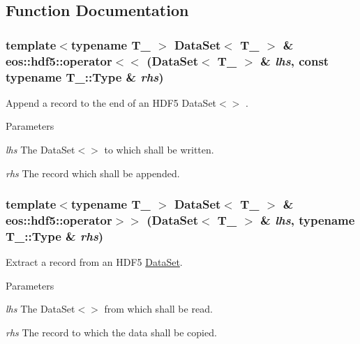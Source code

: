 \subsection{Function Documentation}
\hypertarget{namespaceeos_1_1hdf5_a8da5ea7dae12acf02081ea4fc320dc3a}{
\subsubsection[{operator$<$$<$}]{\setlength{\rightskip}{0pt plus 5cm}template$<$typename T\_\- $>$ {\bf DataSet}$<$ T\_\- $>$ \& eos::hdf5::operator$<$$<$ (DataSet$<$ T\_\- $>$ \& {\em lhs}, \/  const typename T\_\-::Type \& {\em rhs})}}
\label{namespaceeos_1_1hdf5_a8da5ea7dae12acf02081ea4fc320dc3a}
Append a record to the end of an HDF5 DataSet$<$$>$ .


\begin{DoxyParams}{Parameters}
\item[{\em lhs}]The DataSet$<$$>$ to which shall be written. \item[{\em rhs}]The record which shall be appended. \end{DoxyParams}
\hypertarget{namespaceeos_1_1hdf5_a59f5217285970b223b8a4932b811106e}{
\subsubsection[{operator$>$$>$}]{\setlength{\rightskip}{0pt plus 5cm}template$<$typename T\_\- $>$ {\bf DataSet}$<$ T\_\- $>$ \& eos::hdf5::operator$>$$>$ (DataSet$<$ T\_\- $>$ \& {\em lhs}, \/  typename T\_\-::Type \& {\em rhs})}}
\label{namespaceeos_1_1hdf5_a59f5217285970b223b8a4932b811106e}
Extract a record from an HDF5 \hyperlink{classeos_1_1hdf5_1_1DataSet}{DataSet}.


\begin{DoxyParams}{Parameters}
\item[{\em lhs}]The DataSet$<$$>$ from which shall be read. \item[{\em rhs}]The record to which the data shall be copied. \end{DoxyParams}
